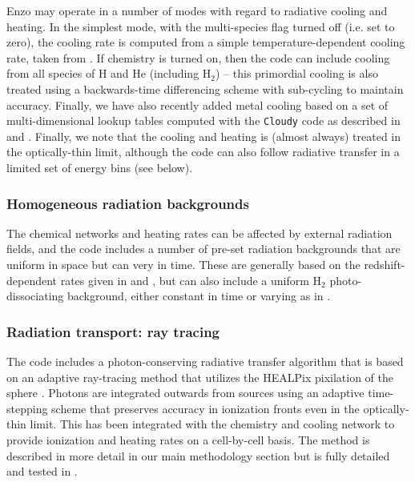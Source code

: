 Enzo may operate in a number of modes with regard to radiative cooling and heating.  In the simplest mode, with the multi-species flag turned off (i.e. set to zero), the cooling rate is computed from a simple temperature-dependent cooling rate, taken from \citet{SW87}.  If chemistry is turned on, then the code can include cooling from all species of H and He (including H$_2$) -- this primordial cooling is also treated using a backwards-time differencing scheme with sub-cycling to maintain accuracy.  Finally, we have also recently added metal cooling based on a set of multi-dimensional lookup tables computed with the \texttt{Cloudy} code \citep{1998PASP..110..761F} as described in \citet{2008MNRAS.385.1443S} and \citet{2011ApJ...731....6S}.  Finally, we note that the cooling and heating is (almost always) treated in the optically-thin limit, although the code can also follow radiative transfer in a limited set of energy bins (see below).

\subsubsection{Homogeneous radiation backgrounds}

The chemical networks and heating rates can be affected by external radiation fields, and the code includes a number of pre-set radiation backgrounds that are uniform in space but can very in time.  These are generally based on the redshift-dependent rates given in \citet{1996ApJ...461...20H} and \citet{2012ApJ...746..125H}, but can also include a uniform H$_2$ photo-dissociating background, either constant in time or varying as in \citet{WiseAbel05}.

\subsubsection{Radiation transport: ray tracing}

The code includes a photon-conserving radiative transfer algorithm that is based on an adaptive ray-tracing method that utilizes the HEALPix pixilation of the sphere \citep{AbelWandelt02}.  Photons are integrated outwards from sources using an adaptive time-stepping scheme that preserves accuracy in ionization fronts even in the optically-thin limit.  This has been integrated with the chemistry and cooling network to provide ionization and heating rates on a cell-by-cell basis.  The method is described in more detail in our main methodology section but is fully detailed and tested in \citet{Wise11_Moray}.

